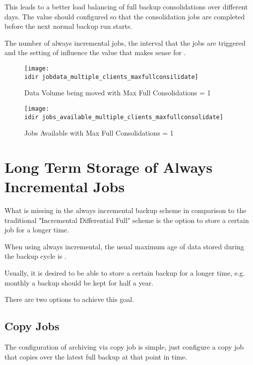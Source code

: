 This leads to a better load balancing of full backup consolidations over different days. 
The value should configured so that the consolidation jobs are completed before the next normal backup run starts.

The number of always incremental jobs, the interval that the jobs are triggered
and the setting of  influence the value
that makes sense for .

\begin{figure}[htbp]
\centering
\texttt{[image: \\idir jobdata\_multiple\_clients\_maxfullconsilidate]}
\caption{Data Volume being moved with Max Full Consolidations = 1}%
\end{figure}%

\begin{figure}[htbp]
\centering
\texttt{[image: \\idir jobs\_available\_multiple\_clients\_maxfullconsolidate]}
\caption{Jobs Available with Max Full Consolidations = 1}%
\end{figure}%


\section{Long Term Storage of Always Incremental Jobs}
\label{sec:AlwaysIncrementalLongTermStorage}

What is missing in the always incremental backup scheme in comparison to the traditional "Incremental Differential Full" scheme is the option to store a certain job for a longer time.

When using always incremental, the usual maximum age of data stored during the backup cycle is .

Usually, it is desired to be able to store a certain backup for a longer time, e.g. monthly a backup should be kept for half a year.

There are two options to achieve this goal.

\subsection{Copy Jobs}

The configuration of archiving via copy job is simple, just configure a copy job that copies over the latest full backup
at that point in time.

